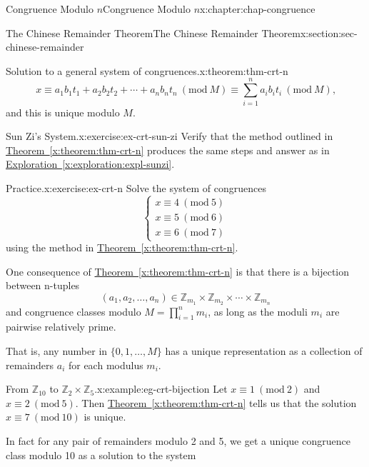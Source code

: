 \documentclass[oneside,10pt,]{book}
\newcommand{\xreffont}{\relax}
\numberwithin{equation}{section}
\newcommand{\Mod}[1]{\ \left(\mathrm{mod}\ #1\right)}
\begin{document}
\begin{chapterptx}{Congruence Modulo \(n\)}{}{Congruence Modulo \(n\)}{}{}{x:chapter:chap-congruence}
\begin{sectionptx}{The Chinese Remainder Theorem}{}{The Chinese Remainder Theorem}{}{}{x:section:sec-chinese-remainder}
\begin{theorem}{Solution to a general system of congruences.}{}{x:theorem:thm-crt-n}
\begin{equation*}
x \equiv a_1b_1t_1 + a_2b_2t_2 + \cdots + a_nb_nt_n \Mod{M}\equiv \sum_{i=1}^n a_ib_it_i \Mod{M}\text{,}
\end{equation*}
and this is unique modulo \(M\).%
\end{theorem}
\begin{inlineexercise}{Sun Zi's System.}{x:exercise:ex-crt-sun-zi}%
Verify that the method outlined in \hyperref[x:theorem:thm-crt-n]{Theorem~{\xreffont\ref{x:theorem:thm-crt-n}}} produces the same steps and answer as in \hyperref[x:exploration:expl-sunzi]{Exploration~{\xreffont\ref{x:exploration:expl-sunzi}}}.%
\end{inlineexercise}
\begin{inlineexercise}{Practice.}{x:exercise:ex-crt-n}%
Solve the system of congruences%
\begin{equation*}
\begin{cases} x \equiv 4 \Mod{5} \\ x \equiv 5 \Mod{6} \\ x \equiv 6 \Mod{7} \end{cases}
\end{equation*}
using the method in \hyperref[x:theorem:thm-crt-n]{Theorem~{\xreffont\ref{x:theorem:thm-crt-n}}}.%
\end{inlineexercise}
One consequence of \hyperref[x:theorem:thm-crt-n]{Theorem~{\xreffont\ref{x:theorem:thm-crt-n}}} is that there is a bijection between n-tuples%
\begin{equation*}
(a_1,a_2,\ldots,a_n) \in \mathbb{Z}_{m_1} \times \mathbb{Z}_{m_2} \times \cdots \times \mathbb{Z}_{m_n}
\end{equation*}
and congruence classes modulo \(M = \prod_{i=1}^n m_i\), as long as the moduli \(m_i\) are pairwise relatively prime.%
\par
That is, any number in \(\{0,1,\ldots,M\}\) has a unique representation as a collection of remainders \(a_i\) for each modulus \(m_i\).%
\begin{example}{From \(\mathbb{Z}_{10}\) to \(\mathbb{Z}_2 \times \mathbb{Z}_5\).}{x:example:eg-crt-bijection}%
Let \(x \equiv 1 \Mod{2}\) and \(x \equiv 2 \Mod{5}\). Then \hyperref[x:theorem:thm-crt-n]{Theorem~{\xreffont\ref{x:theorem:thm-crt-n}}} tells us that the solution \(x \equiv 7 \Mod{10}\) is unique.%
\par
In fact for any pair of remainders modulo 2 and 5, we get a unique congruence class modulo 10 as a solution to the system%
\begin{equation*}

\end{equation*}
\end{example}
\end{sectionptx}
\end{chapterptx}
\end{document}
